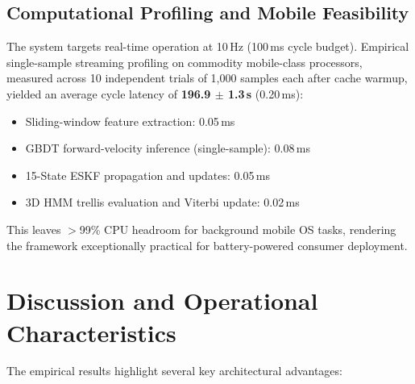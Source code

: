 \documentclass[conference]{IEEEtran}
\begin{document}
\subsection{Computational Profiling and Mobile Feasibility}

The system targets real-time operation at 10\,Hz (100\,ms cycle budget). Empirical single-sample streaming profiling on commodity mobile-class processors, measured across 10 independent trials of 1,000 samples each after cache warmup, yielded an average cycle latency of \textbf{196.9 $\pm$ 1.3\,\textmu s} (0.20\,ms):
\begin{itemize}
\item Sliding-window feature extraction: 0.05\,ms
\item GBDT forward-velocity inference (single-sample): 0.08\,ms
\item 15-State ESKF propagation and updates: 0.05\,ms
\item 3D HMM trellis evaluation and Viterbi update: 0.02\,ms
\end{itemize}
This leaves $>$99\% CPU headroom for background mobile OS tasks, rendering the framework exceptionally practical for battery-powered consumer deployment.

\section{Discussion and Operational Characteristics}

The empirical results highlight several key architectural advantages:
\end{document}

